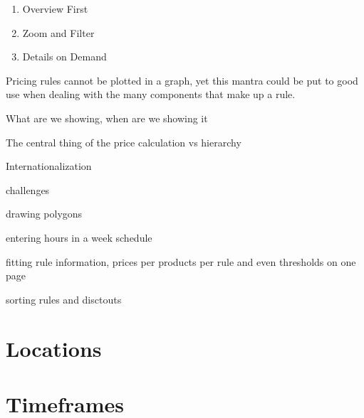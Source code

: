 \begin{enumerate}
	\item Overview First
	\item Zoom and Filter
	\item Details on Demand
\end{enumerate}

Pricing rules cannot be plotted in a graph, yet this mantra could be put to good use when dealing with the many components that make up a rule.


What are we showing, when are we showing it

The central thing of the price calculation vs hierarchy

Internationalization




challenges

drawing polygons

entering hours in a week schedule

fitting rule information, prices per products per rule and even thresholds on one page

sorting rules and disctouts

\section{Locations}
\section{Timeframes}